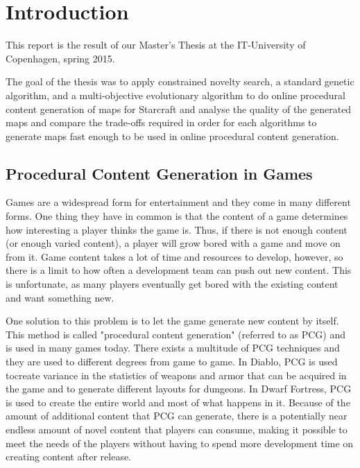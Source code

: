\chapter{Introduction}
\label{introduction}

This report is the result of our Master's Thesis at the IT-University of Copenhagen, spring 2015.

The goal of the thesis was to apply constrained novelty search, a standard genetic algorithm, and a multi-objective evolutionary algorithm to do online procedural content generation of maps for Starcraft and analyse the quality of the generated maps and compare the trade-offs required in order for each algorithms to generate maps fast enough to be used in online\cite{shaker2015procedural} procedural content generation.

\section{Procedural Content Generation in Games}
\label{introdution_pcg}

Games are a widespread form for entertainment and they come in many different forms. One thing they have in common is that the content of a game determines how interesting a player thinks the game is. Thus, if there is not enough content (or enough varied content), a player will grow bored with a game and move on from it. Game content takes a lot of time and resources to develop, however, so there is a limit to how often a development team can push out new content. This is unfortunate, as many players eventually get bored with the existing content and want something new.

One solution to this problem is to let the game generate new content by itself. This method is called "procedural content generation" (referred to as PCG) and is used in many games today. There exists a multitude of PCG techniques and they are used to different degrees from game to game. In Diablo\cite{diablo3}, PCG is used tocreate variance in the statistics of weapons and armor that can be acquired in the game and to generate different layouts for dungeons. In Dwarf Fortress\cite{dwarffortress}, PCG is used to create the entire world and most of what happens in it. Because of the amount of additional content that PCG can generate, there is a potentially near endless amount of novel content that players can consume, making it possible to meet the needs of the players without having to spend more development time on creating content after release.
